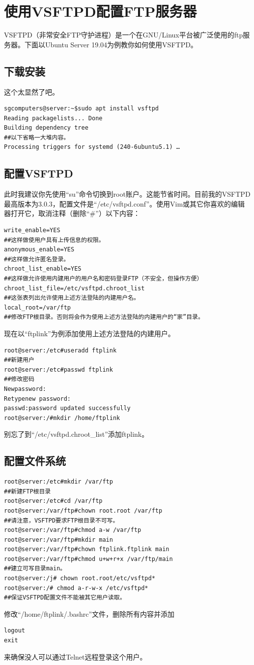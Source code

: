 \section{使用VSFTPD配置FTP服务器}
VSFTPD（非常安全FTP守护进程）是一个在GNU/Linux平台被广泛使用的ftp服务器。下面以Ubuntu Server 19.04为例教你如何使用VSFTPD。
\subsection{下载安装}
这个太显然了吧。
\begin{verbatim}
sgcomputers@server:~$sudo apt install vsftpd
Reading packagelists... Done
Building dependency tree
##以下省略一大堆内容。
Processing triggers for systemd (240-6ubuntu5.1) …
\end{verbatim}
\subsection{配置VSFTPD}
此时我建议你先使用“su”命令切换到root账户。这能节省时间。目前我的VSFTPD最高版本为3.0.3，配置文件是“/etc/vsftpd.conf”。使用Vim或其它你喜欢的编辑器打开它，取消注释（删除“\#”）以下内容：
\begin{verbatim}
write_enable=YES
##这样做使用户具有上传信息的权限。
anonymous_enable=YES
##这样做允许匿名登录。
chroot_list_enable=YES
##这样做允许使用内建用户的用户名和密码登录FTP（不安全，但操作方便）
chroot_list_file=/etc/vsftpd.chroot_list
##这张表列出允许使用上述方法登陆的内建用户名。
local_root=/var/ftp
##修改FTP根目录。否则将会作为使用上述方法登陆的内建用户的“家”目录。
\end{verbatim}\par
现在以“ftplink”为例添加使用上述方法登陆的内建用户。
\begin{verbatim}
root@server:/etc#useradd ftplink
##新建用户
root@server:/etc#passwd ftplink
##修改密码
Newpassword:
Retypenew password:
passwd:password updated successfully
root@server:/#mkdir /home/ftplink
\end{verbatim}\par
别忘了到“/etc/vsftpd.chroot\_list”添加ftplink。
\subsection{配置文件系统}
\begin{verbatim}
root@server:/etc#mkdir /var/ftp
##新建FTP根目录
root@server:/etc#cd /var/ftp
root@server:/var/ftp#chown root.root /var/ftp
##请注意，VSFTPD要求FTP根目录不可写。
root@server:/var/ftp#chmod a-w /var/ftp
root@server:/var/ftp#mkdir main
root@server:/var/ftp#chown ftplink.ftplink main
root@server:/var/ftp#chmod u+w+r+x /var/ftp/main
##建立可写目录main。
root@server:/j# chown root.root/etc/vsftpd*
root@server:/# chmod a-r-w-x /etc/vsftpd*
##保证VSFTPD配置文件不能被其它用户读取。
\end{verbatim}\par
修改“/home/ftplink/.bashrc”文件，删除所有内容并添加
\begin{verbatim}
logout
exit
\end{verbatim}\par
来确保没人可以通过Telnet远程登录这个用户。
